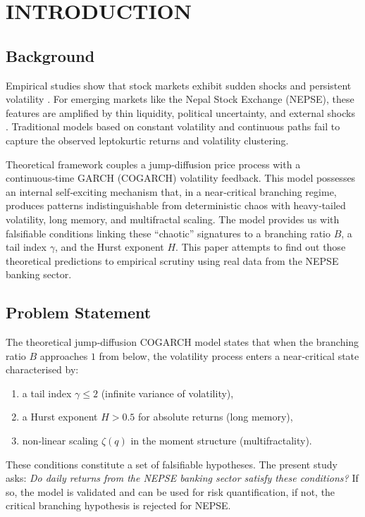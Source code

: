\chapter{INTRODUCTION}

\section{Background}
Empirical studies show that stock markets exhibit sudden shocks and persistent volatility \cite{duong2010empirical}. For emerging markets like the Nepal Stock Exchange (NEPSE), these features are amplified by thin liquidity, political uncertainty, and external shocks \cite{worldbank2020nepal}. Traditional models based on constant volatility and continuous paths fail to capture the observed leptokurtic returns and volatility clustering.

Theoretical framework \cite{kluppelberg2004continuous} couples a jump‑diffusion price process with a continuous‑time GARCH (COGARCH) volatility feedback. This model possesses an internal self‑exciting mechanism that, in a near‑critical branching regime, produces patterns indistinguishable from deterministic chaos with heavy‑tailed volatility, long memory, and multifractal scaling. The model provides us with falsifiable conditions linking these “chaotic” signatures to a branching ratio $B$, a tail index $\gamma$, and the Hurst exponent $H$. This paper attempts to find out those theoretical predictions to empirical scrutiny using real data from the NEPSE banking sector.

\section{Problem Statement}
The theoretical jump‑diffusion COGARCH model states that when the branching ratio $B$ approaches $1$ from below, the volatility process enters a near‑critical state characterised by:
\begin{enumerate}[label=(\roman*)]
    \item a tail index $\gamma \le 2$ (infinite variance of volatility),
    \item a Hurst exponent $H > 0.5$ for absolute returns (long memory),
    \item non‑linear scaling $\zeta(q)$ in the moment structure (multifractality).
\end{enumerate}
These conditions constitute a set of falsifiable hypotheses. The present study asks: \emph{Do daily returns from the NEPSE banking sector satisfy these conditions?} If so, the model is validated and can be used for risk quantification, if not, the critical branching hypothesis is rejected for NEPSE.

